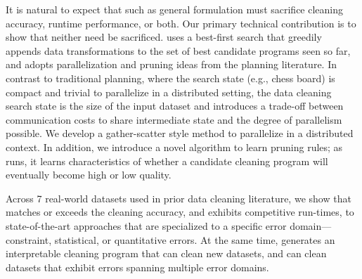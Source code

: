 It is natural to expect that such as general formulation must sacrifice cleaning accuracy, runtime performance, or both.  Our primary technical contribution is to show that neither need be sacrificed.  \sys uses a best-first search that greedily appends data transformations to the set of best candidate programs seen so far, and adopts parallelization and pruning ideas from the planning literature.  In contrast to traditional planning, where the search state (e.g., chess board) is compact and trivial to parallelize in a distributed setting, the data cleaning search state is the size of the input dataset and introduces a trade-off between communication costs to share intermediate state and the degree of parallelism possible.  We develop a gather-scatter style method to parallelize \sys in a distributed context.  In addition, we introduce a novel algorithm to learn pruning rules; as \sys runs, it learns characteristics of whether a candidate cleaning program will eventually become high or low quality.  

Across 7 real-world datasets used in prior data cleaning literature, we show that \sys matches or exceeds the cleaning accuracy, and exhibits competitive run-times, to state-of-the-art approaches that are specialized to a specific error domain---constraint, statistical, or quantitative errors.  At the same time, \sys generates an interpretable cleaning program that can clean new datasets, and can clean datasets that exhibit errors spanning multiple error domains. 




